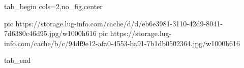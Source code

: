  
 
 
 
 


\ifcmt
  tab_begin cols=2,no_fig,center

     pic https://storage.lug-info.com/cache/d/d/eb6e3981-3110-42d9-8041-7d6380c46d95.jpg/w1000h616%
		 pic https://storage.lug-info.com/cache/b/c/94df9e12-afa0-4553-ba91-7b1db0502364.jpg/w1000h616%

  tab_end
\fi
